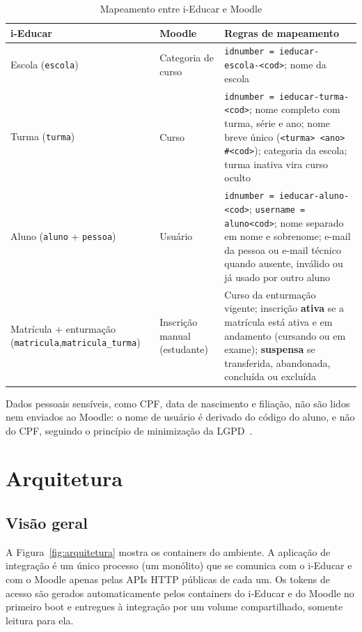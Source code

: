 \documentclass[12pt]{article}
\newcommand{\cod}[1]{\texttt{#1}}
\begin{document}
\begin{table}[H]
\centering
\caption{Mapeamento entre i-Educar e Moodle}
\label{tab:mapeamento}
\footnotesize
\begin{tabularx}{\linewidth}{>{\raggedright\arraybackslash}p{3.0cm}>{\raggedright\arraybackslash}p{1.8cm}>{\raggedright\arraybackslash}X}
\toprule
\textbf{i-Educar} & \textbf{Moodle} & \textbf{Regras de mapeamento} \\
\midrule
Escola (\cod{escola}) & Categoria de curso & \cod{idnumber = ieducar-escola-<cod>}; nome da escola \\
Turma (\cod{turma}) & Curso & \cod{idnumber = ieducar-turma-<cod>}; nome completo com turma, série e ano; nome breve único (\cod{<turma> <ano> \#<cod>}); categoria da escola; turma inativa vira curso oculto \\
Aluno (\cod{aluno} + \cod{pessoa}) & Usuário & \cod{idnumber = ieducar-aluno-<cod>}; \cod{username = aluno<cod>}; nome separado em nome e sobrenome; e-mail da pessoa ou e-mail técnico quando ausente, inválido ou já usado por outro aluno \\
Matrícula + enturmação (\cod{matricula},\newline \cod{matricula\_turma}) & Inscrição manual (estudante) & Curso da enturmação vigente; inscrição \textbf{ativa} se a matrícula está ativa e em andamento (cursando ou em exame); \textbf{suspensa} se transferida, abandonada, concluída ou excluída \\
\bottomrule
\end{tabularx}
\end{table}

Dados pessoais sensíveis, como CPF, data de nascimento e filiação, não são
lidos nem enviados ao Moodle: o nome de usuário é derivado do código do aluno,
e não do CPF, seguindo o princípio de minimização da LGPD~\cite{lgpd}.

\section{Arquitetura}
\label{sec:arquitetura}

\subsection{Visão geral}

A Figura~\ref{fig:arquitetura} mostra os containers do ambiente. A aplicação
de integração é um único processo (um monólito) que se comunica com o i-Educar
e com o Moodle apenas pelas APIs HTTP públicas de cada um. Os tokens de acesso
são gerados automaticamente pelos containers do i-Educar e do Moodle no
primeiro boot e entregues à integração por um volume compartilhado, somente
leitura para ela.
\end{document}
